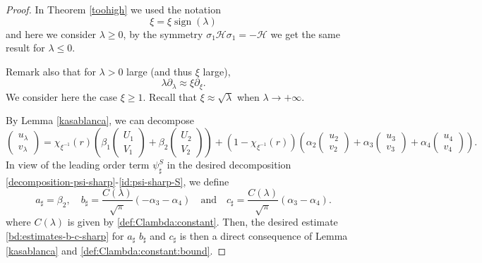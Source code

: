 \documentclass[11 pt]{amsart}
\newcommand{\tmop}[1]{\ensuremath{\operatorname{#1}}}
\theoremstyle{definition}
\theoremstyle{remark}
\numberwithin{equation}{section}
\begin{document}
\begin{proof}
  In Theorem \ref{toohigh} we used the notation
  \[ \xi = \xi \tmop{sign} (\lambda) \]
  and here we consider $\lambda \geqslant 0$, by the symmetry $\sigma_1
  \mathcal{H} \sigma_1 = -\mathcal{H}$ we get the same result for $\lambda
  \leqslant 0$. 
 
Remark also that for $\lambda > 0$ large (and thus $\xi$
  large),
  \[ \lambda \partial_{\lambda} \approx \xi \partial_{\xi} . \]
  We consider here the case $\xi \geqslant 1$. Recall that $\xi \approx
  \sqrt{\lambda}$ when $\lambda \rightarrow + \infty$.
  
By Lemma \ref{kasablanca}, we can decompose
\begin{equation} \label{gnocchi-di-patate}
\begin{pmatrix} u_\lambda \\ v_\lambda \end{pmatrix}= \chi_{\xi^{-1}}(r)\left(\beta_1\begin{pmatrix} U_1\\ V_1\end{pmatrix}+\beta_2\begin{pmatrix} U_2\\ V_2\end{pmatrix} \right)+(1-\chi_{\xi^{-1}}(r))\left(\alpha_2\begin{pmatrix} u_2\\ v_2\end{pmatrix}+\alpha_3\begin{pmatrix} u_3\\ v_3\end{pmatrix}+\alpha_4\begin{pmatrix} u_4\\ v_4\end{pmatrix} \right).
\end{equation}
In view of the leading order term $\psi^S_\sharp$ in the desired decomposition \eqref{decomposition-psi-sharp}-\eqref{id:psi-sharp-S}, we define
$$
a_\sharp=\beta_2, \quad b_\sharp=\frac{C(\lambda)}{\sqrt{\pi}}(-\alpha_3-\alpha_4)\quad \mbox{and} \quad c_\sharp=\frac{C(\lambda)}{\sqrt{\pi}}(\alpha_3-\alpha_4) .
$$
where $C(\lambda)$ is given by \eqref{def:Clambda:constant}. Then, the desired estimate \eqref{bd:estimates-b-c-sharp} for $a_\sharp$ $b_\sharp$ and $c_\sharp$ is then a direct consequence of Lemma \ref{kasablanca} and \eqref{def:Clambda:constant:bound}.


\end{proof}
\end{document}

